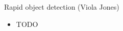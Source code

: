 \documentclass{beamer}
\begin{document}
\begin{frame}{Rapid object detection (Viola Jones)}
  \begin{itemize}
    \item TODO
  \end{itemize}
\end{frame}

\end{document}
